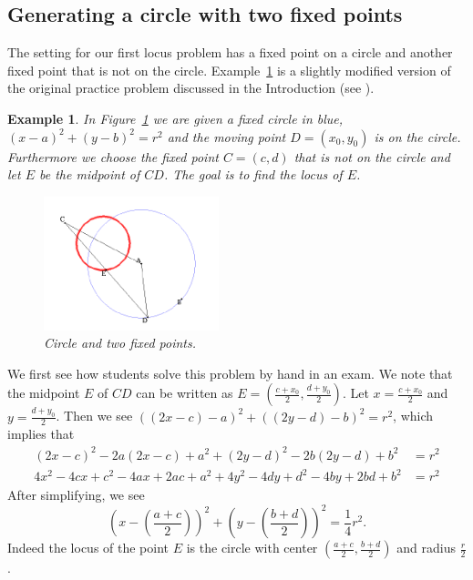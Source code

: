 \documentclass[12pt,a4paper]{article}%
\newtheorem{example}[theorem]{Example}
\begin{document}
\subsection{Generating a circle with two fixed points} \label{ssec2-1}

The setting for our first locus problem has a fixed point on a circle and another
fixed point that is not on the circle. 
Example~\ref{ex1} is a slightly modified version of the original practice problem discussed
in the Introduction
(see \cite{Gao}).

\begin{example} \label{ex1}
In Figure~\ref{fig1} we are given a fixed circle in blue,
$(x-a)^{2}+(y-b)^{2}=r^{2}$ and the moving point $D=(x_{0},y_{0})$
is on the circle. Furthermore we choose the fixed point $C=(c,d)$ that is
not on the circle and let $E$ be the midpoint of $CD$.
The goal is to find the locus of $E$.%
\begin{figure}[htbp]
\begin{center}
 \includegraphics[width=2.0in,keepaspectratio]{PJH75H11-crop.pdf}
\end{center}
 \caption{Circle and two fixed points.}
 \label{fig1}
\end{figure}
\end{example}

We first see how students solve this problem by hand in an exam. We note that
the midpoint $E$ of $CD$ can be written as
$E=\left(  \frac{c+x_{0}}{2}, \frac{d+y_{0}}{2}\right)$.
Let $x=\frac{c+x_{0}}{2}$ and $y=\frac{d+y_{0}}{2}$.
Then we see $\left(  \left(  2x-c\right)  -a\right)  ^{2}+\left(\left(  2y-d\right)  -b\right)  ^{2}=r^{2}$,
which implies that
\begin{align*}
\left(  2x-c\right)  ^{2}-2a\left(  2x-c\right)  +a^{2}+\left(  2y-d\right)
^{2}-2b\left(  2y-d\right)  +b^{2}  & =r^{2}\\
4x^{2}-4cx+c^{2}-4ax+2ac+a^{2}+4y^{2}-4dy+d^{2}-4by+2bd+b^{2}  & =r^{2}%
\end{align*}
After simplifying, we see
\[
\left(  x-\left(  \frac{a+c}{2}\right)  \right)  ^{2}+\left(  y-\left(
\frac{b+d}{2}\right)  \right)  ^{2}=\frac{1}{4}r^{2}.
\]
Indeed the locus of the point $E$ is the circle with center $\left(  \frac{a+c}{2},\frac{b+d}{2}\right)$
and radius $\frac{r}{2}$.
\end{document}
